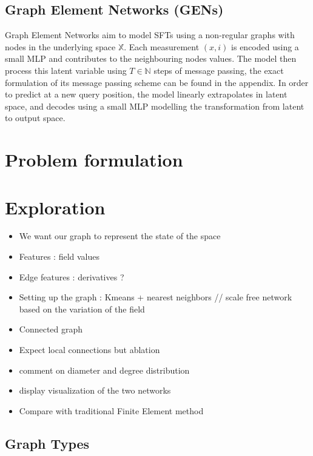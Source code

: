 \documentclass[a4paper,10pt]{article}
\newcommand{\ap}[1]{\marginpar{{\tiny \color{purple} [AP] #1}}}
\begin{document}
\subsection{Graph Element Networks (GENs)} \label{ssec:gen}
Graph Element Networks \cite{alet2019gen} aim to model SFTs using a non-regular graphs with nodes in the underlying space $\mathbb{X}$. Each measurement $(x, i)$ is encoded using a small MLP and contributes to the neighbouring nodes values. The model then process this latent variable using $T \in \mathbb{N}$ steps of message passing, the exact formulation of its message passing scheme can be found in the appendix.
In order to predict at a new query position, the model linearly extrapolates in latent space, and decodes using a small MLP modelling the transformation from latent to output space.
\ap{advantages / drawbacks}

\section{Problem formulation}

\section{Exploration}

\begin{itemize}
  \item We want our graph to represent the state of the space
  \item Features : field values
  \item Edge features : derivatives ?
  \item Setting up the graph : Kmeans + nearest neighbors // scale free network based on the variation of the field
  \item Connected graph
  \item Expect local connections but ablation
  \item comment on diameter and degree distribution
  \item display visualization of the two networks
  \item Compare with traditional Finite Element method
\end{itemize}

\subsection{Graph Types}
\end{document}

